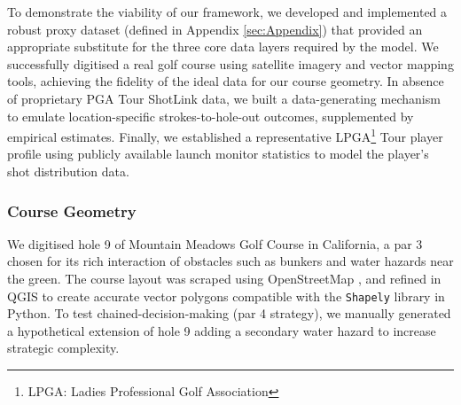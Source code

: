\documentclass[11pt, letterpaper]{article}
\begin{document}
To demonstrate the viability of our framework, we developed and implemented a robust proxy dataset (defined in Appendix \ref{sec:Appendix}) that provided an appropriate substitute for the three core data layers required by the model. We successfully digitised a real golf course using satellite imagery and vector mapping tools, achieving the fidelity of the ideal data for our course geometry. In absence of proprietary PGA Tour ShotLink data, we built a data-generating mechanism to emulate location-specific strokes-to-hole-out outcomes, supplemented by empirical estimates. Finally, we established a representative LPGA\footnote{LPGA: Ladies Professional Golf Association} Tour player profile using publicly available launch monitor statistics to model the player's shot distribution data.

\subsubsection{Course Geometry}
We digitised hole 9 of Mountain Meadows Golf Course in California, a par 3 chosen for its rich interaction of obstacles such as bunkers and water hazards near the green. The course layout was scraped using OpenStreetMap \parencite{openstreetmap}, and refined in QGIS \parencite{qgis} to create accurate vector polygons compatible with the \texttt{Shapely} \parencite{shapely} library in Python. To test chained-decision-making (par 4 strategy), we manually generated a hypothetical extension of hole 9 adding a secondary water hazard to increase strategic complexity. 
\end{document}
